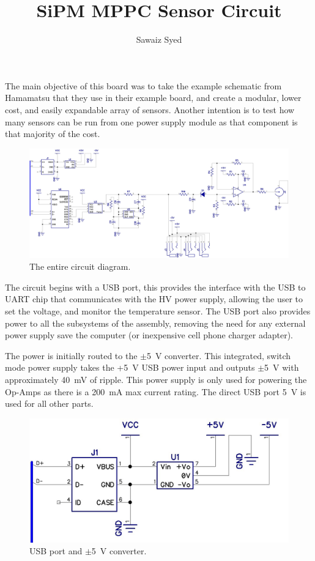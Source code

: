\documentclass[]{Article}
\author{Sawaiz Syed}
\title{SiPM MPPC Sensor Circuit}
\begin{document}
	
\maketitle
	
The main objective of this board was to take the example schematic from Hamamatsu that they use in their example board, and create a modular, lower cost, and easily expandable array of sensors. Another intention is to test how many sensors can be run from one power supply module as that component is that majority of the cost.

\begin{figure}[h!]
	\centering
	\includegraphics[width=\textwidth]{assets/sipm}
	\caption{The entire circuit diagram.}
\end{figure}

The circuit begins with a USB port, this provides the interface with the USB to UART chip that communicates with the HV power supply, allowing the user to set the voltage, and monitor the temperature sensor. The USB port also provides power to all the subsystems of the assembly, removing the need for any external power supply save the computer (or inexpensive cell phone charger adapter).

The power is initially routed to the $\pm$\SI{5}{\volt} converter. This integrated, switch mode power supply takes the +\SI{5}{\volt} USB power input and outputs $\pm$\SI{5}{\volt} with approximately \SI{40}{\milli\volt} of ripple. This power supply is only used for powering the Op-Amps as there is a \SI{200}{\milli\ampere} max current rating. The direct USB port \SI{5}{\volt} is used for all other parts.

\begin{figure}[h!]
	\centering
	\includegraphics[width=\textwidth]{assets/power}
	\caption{USB port and $\pm$\SI{5}{\volt} converter.}
\end{figure}
\end{document}
